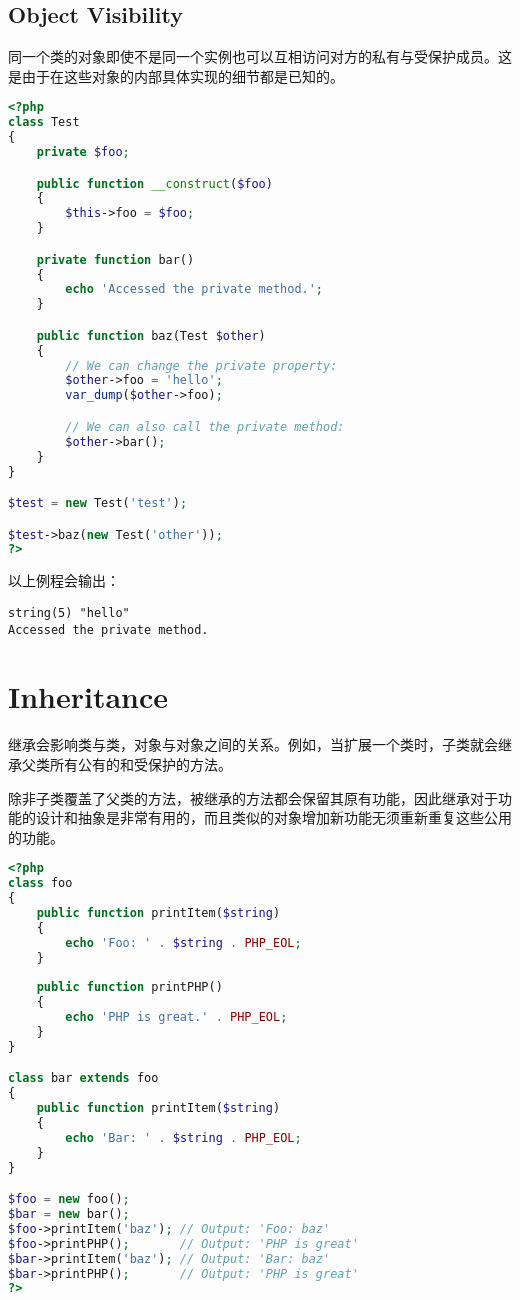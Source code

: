 \section{Object Visibility}

同一个类的对象即使不是同一个实例也可以互相访问对方的私有与受保护成员。这是由于在这些对象的内部具体实现的细节都是已知的。

\begin{lstlisting}[language=PHP]
<?php
class Test
{
    private $foo;

    public function __construct($foo)
    {
        $this->foo = $foo;
    }

    private function bar()
    {
        echo 'Accessed the private method.';
    }

    public function baz(Test $other)
    {
        // We can change the private property:
        $other->foo = 'hello';
        var_dump($other->foo);

        // We can also call the private method:
        $other->bar();
    }
}

$test = new Test('test');

$test->baz(new Test('other'));
?>
\end{lstlisting}

以上例程会输出：

\begin{verbatim}
string(5) "hello"
Accessed the private method.
\end{verbatim}


\chapter{Inheritance}

继承会影响类与类，对象与对象之间的关系。例如，当扩展一个类时，子类就会继承父类所有公有的和受保护的方法。

除非子类覆盖了父类的方法，被继承的方法都会保留其原有功能，因此继承对于功能的设计和抽象是非常有用的，而且类似的对象增加新功能无须重新重复这些公用的功能。




\begin{lstlisting}[language=PHP]
<?php
class foo
{
    public function printItem($string) 
    {
        echo 'Foo: ' . $string . PHP_EOL;
    }
    
    public function printPHP()
    {
        echo 'PHP is great.' . PHP_EOL;
    }
}

class bar extends foo
{
    public function printItem($string)
    {
        echo 'Bar: ' . $string . PHP_EOL;
    }
}

$foo = new foo();
$bar = new bar();
$foo->printItem('baz'); // Output: 'Foo: baz'
$foo->printPHP();       // Output: 'PHP is great' 
$bar->printItem('baz'); // Output: 'Bar: baz'
$bar->printPHP();       // Output: 'PHP is great'
?>
\end{lstlisting}



